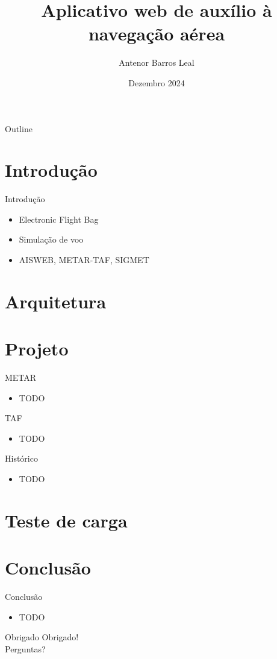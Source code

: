 \documentclass{beamer}
\title{Aplicativo web de auxílio à navegação aérea}
\author{Antenor Barros Leal}
\institute{Departamento de Informática \\ PUC-Rio}
\date{Dezembro 2024}
\begin{document}
\begin{frame}
    \titlepage
\end{frame}

\begin{frame}{Outline}
    \tableofcontents
\end{frame}

\section{Introdução}

\begin{frame}{Introdução}
    \begin{itemize}
        \item Electronic Flight Bag
        \item Simulação de voo
        \item AISWEB, METAR-TAF, SIGMET
    \end{itemize}
\end{frame}

\section{Arquitetura}

\section{Projeto}

\begin{frame}{METAR}
    \begin{itemize}
        \item TODO
    \end{itemize}
\end{frame}

\begin{frame}{TAF}
    \begin{itemize}
        \item TODO
    \end{itemize}
\end{frame}

\begin{frame}{Histórico}
    \begin{itemize}
        \item TODO
    \end{itemize}
\end{frame}

\section{Teste de carga}

\section{Conclusão}

\begin{frame}{Conclusão}
    \begin{itemize}
        \item TODO
    \end{itemize}
\end{frame}

\begin{frame}{Obrigado}
    \centering
    \Huge Obrigado! \\
    \normalsize Perguntas?
\end{frame}
\end{document}
